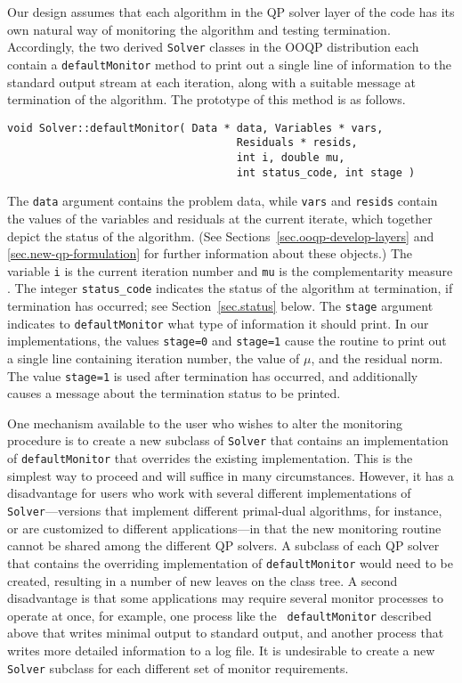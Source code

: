 Our design assumes that each algorithm in the QP solver layer of the
code has its own natural way of monitoring the algorithm and testing
termination. Accordingly, the two derived {\tt Solver} classes in the
OOQP distribution each contain a {\tt defaultMonitor} method to print
out a single line of information to the standard output stream at each
iteration, along with a suitable message at termination of the
algorithm. The prototype of this method is as follows.
\begin{verbatim}
void Solver::defaultMonitor( Data * data, Variables * vars,
                                    Residuals * resids,
                                    int i, double mu, 
                                    int status_code, int stage )
\end{verbatim}
The {\tt data} argument contains the problem data, while {\tt vars}
and {\tt resids} contain the values of the variables and residuals at
the current iterate, which together depict the status of the
algorithm. (See Sections~\ref{sec.ooqp-develop-layers} and
\ref{sec.new-qp-formulation} for further information about these
objects.)  The variable \texttt{i} is the current iteration number and
\texttt{mu} is the complementarity measure . The integer
{\tt status\_code} indicates the status of the algorithm at
termination, if termination has occurred; see Section~\ref{sec.status}
below. The {\tt stage} argument indicates to {\tt defaultMonitor} what
type of information it should print.  In our implementations, the
values {\tt stage=0} and {\tt stage=1} cause the routine to print out
a single line containing iteration number, the value of $\mu$, and the
residual norm. The value {\tt stage=1} is used after termination has
occurred, and additionally causes a message about the termination
status to be printed.

One mechanism available to the user who wishes to alter
the monitoring procedure is to create a new subclass of {\tt Solver}
that contains an implementation of {\tt defaultMonitor} that overrides
the existing implementation. This is the simplest way to proceed and
will suffice in many circumstances.  However, it has a disadvantage for
users who work with several different implementations of {\tt
Solver}---versions that implement different primal-dual algorithms,
for instance, or are customized to different applications---in that
the new monitoring routine cannot be shared among the different QP
solvers. A subclass of each QP solver that contains the overriding
implementation of {\tt defaultMonitor} would need to be created,
resulting in a number of new leaves on the class tree. A second
disadvantage is that some applications may require several monitor
processes to operate at once, for example, one process like the {\tt
defaultMonitor} described above that writes minimal output to standard
output, and another process that writes more detailed information to a
log file. It is undesirable to create a new {\tt Solver} subclass for
each different set of monitor requirements.


